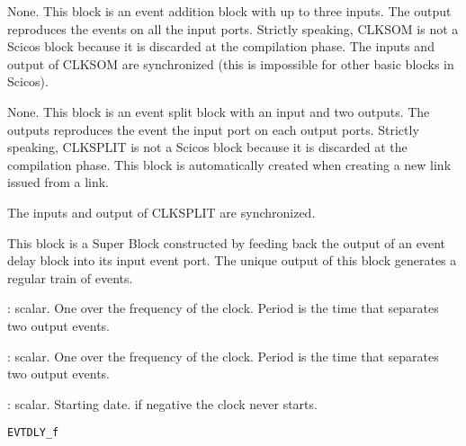 %
%


\label{CLKSOMf}

None.
This block is an event addition block with up to three inputs. The
output reproduces 
the events on all the input ports. Strictly speaking, CLKSOM is not a
Scicos block because it is discarded at the compilation phase. The
inputs and output of CLKSOM are synchronized (this is impossible for
other basic blocks in Scicos). 









%
%


\label{CLKSPLITf}

None.
This block is an event split block with an input and two outputs. The
outputs reproduces the event the input port on each output ports. 
Strictly speaking, CLKSPLIT is not a Scicos block because it is
discarded at the compilation phase. This block is automatically
created when creating a new link issued from a link.

The inputs and output of CLKSPLIT are synchronized. 









%
%


\label{CLOCKf}

This block is a Super Block constructed by feeding back the output
of an event delay block into its input event port. The unique
output of this block generates a regular train of events.
\begin{scitem}
\item[{\verb?Period?}]
: scalar. One over the frequency of the clock. Period is the time that
separates two output events.
\item[{\verb?Period?}]
: scalar. One over the frequency of the clock. Period is the time that
separates two output events.
\item[{\verb?Init time?}]
: scalar. Starting date. if negative the clock never starts.

\end{scitem}%
{\verb?EVTDLY_f?} \pageref{EVTDLYf}







